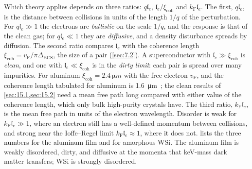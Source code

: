 Which theory applies depends on three ratios: $q\mathfrak{l}_e$, $\mathfrak{l}_e/\xi_{\mathrm{coh}}$ and $k_{\mathrm{F}}\mathfrak{l}_e$. The first, $q\mathfrak{l}_e$, is the distance between collisions in units of the length $1/q$ of the perturbation. For $q\mathfrak{l}_e \gg 1$ the electrons are \emph{ballistic} on the scale $1/q$, and the response is that of the clean gas; for $q\mathfrak{l}_e \ll 1$ they are \emph{diffusive}, and a density disturbance spreads by diffusion. The second ratio compares $\mathfrak{l}_e$ with the coherence length $\xi_{\mathrm{coh}} = v_{\mathrm{F}}/\pi\Delta_{\mathrm{BCS}}$, the size of a pair (\cref{sec:7.2}). A superconductor with $\mathfrak{l}_e \gg \xi_{\mathrm{coh}}$ is \emph{clean}, and one with $\mathfrak{l}_e \ll \xi_{\mathrm{coh}}$ is in the \emph{dirty limit}: each pair is spread over many impurities. For aluminum $\xi_{\mathrm{coh}} = \SI{2.4}{\micro m}$ with the free-electron $v_{\mathrm{F}}$, and the coherence length tabulated for aluminum is \SI{1.6}{\micro m}~\cite[Ch.~10, Table~5]{kittel2005introduction}; the clean results of \cref{sec:15.1,sec:15.2} need a mean free path long compared with either value of the coherence length, which only bulk high-purity crystals have. The third ratio, $k_{\mathrm{F}}\mathfrak{l}_e$, is the mean free path in units of the electron wavelength. Disorder is weak for $k_{\mathrm{F}}\mathfrak{l}_e \gg 1$, where an electron still has a well-defined momentum between collisions, and strong near the Ioffe--Regel limit $k_{\mathrm{F}}\mathfrak{l}_e \approx 1$, where it does not.  lists the three numbers for the aluminum film and for amorphous WSi. The aluminum film is weakly disordered, dirty, and diffusive at the momenta that keV-mass dark matter transfers; WSi is strongly disordered.

